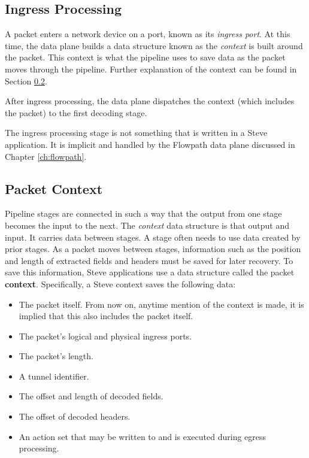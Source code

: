 \subsection{Ingress Processing} \label{ingress_desc}

A packet enters a network device on a port, known as its \textit{ingress port}. At this time, the data plane builds a data structure known as the \textit{context} is built around the packet. This context is what the pipeline uses to save data as the packet moves through the pipeline. Further explanation of the context can be found in Section \ref{context_desc}.

After ingress processing, the data plane dispatches the context (which includes the packet) to the first decoding stage.

The ingress processing stage is not something that is written in a Steve application. It is implicit and handled by the Flowpath data plane discussed in Chapter \ref{ch:flowpath}. 

\subsection{Packet Context} \label{context_desc}

Pipeline stages are connected in such a way that the output from one stage becomes the input to the next. The \textit{context} data structure is that output and input. It carries data between stages. A stage often needs to use data created by prior stages. As a packet moves between stages, information such as the position and length of extracted fields and headers must be saved for later recovery. To save this information, Steve applications use a data structure called the packet \textbf{context}. Specifically, a Steve context saves the following data:

\begin{itemize}
\item The packet itself. From now on, anytime mention of the context is made, it is implied that this also includes the packet itself.
\item The packet's logical and physical ingress ports.
\item The packet's length.
\item A tunnel identifier.
\item The offset and length of decoded fields.
\item The offset of decoded headers.
\item An action set that may be written to and is executed during egress processing.
\end{itemize}

